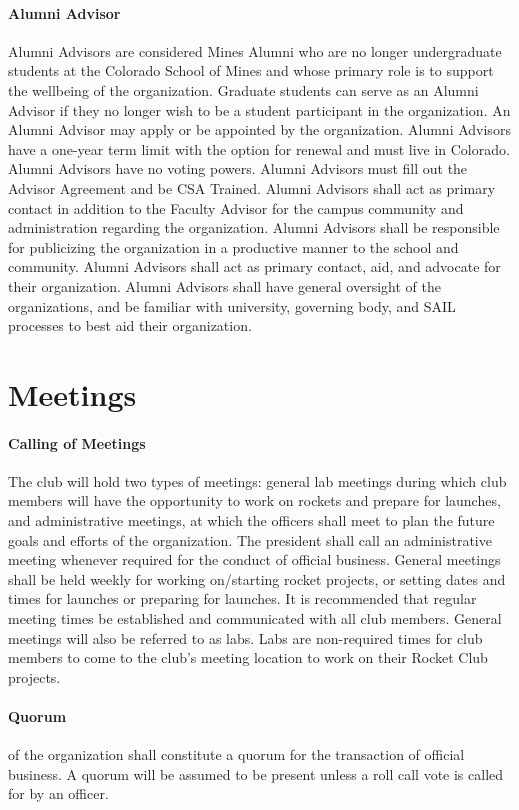 \documentclass[12pt]{article}
\begin{document}
\paragraph{Alumni Advisor}
Alumni Advisors are considered Mines Alumni who are no longer undergraduate students at the Colorado School of Mines and whose primary role is to support the wellbeing of the organization. 
Graduate students can serve as an Alumni Advisor if they no longer wish to be a student participant in the organization. 
An Alumni Advisor may apply or be appointed by the organization. Alumni Advisors have a one-year term limit with the option for renewal and must live in Colorado. 
Alumni Advisors have no voting powers. Alumni Advisors must fill out the Advisor Agreement and be CSA Trained. 
Alumni Advisors shall act as primary contact in addition to the Faculty Advisor for the campus community and administration regarding the organization. 
Alumni Advisors shall be responsible for publicizing the organization in a productive manner to the school and community. 
Alumni Advisors shall act as primary contact, aid, and advocate for their organization. 
Alumni Advisors shall have general oversight of the organizations, and be familiar with university, governing body, and SAIL processes to best aid their organization.

\section{Meetings}
\paragraph{Calling of Meetings}
The club will hold two types of meetings: general lab meetings during which club members will have the opportunity to work on rockets and prepare for launches, 
and administrative meetings, at which the officers shall meet to plan the future goals and efforts of the organization.
The president shall call an administrative meeting whenever required for the conduct of official business. 
General meetings shall be held weekly for working on/starting rocket projects, 
or setting dates and times for launches or preparing for launches. 
It is recommended that regular meeting times be established and communicated with all club members. 
General meetings will also be referred to as labs. 
Labs are non-required times for club members to come to the club's meeting location to work on their Rocket Club projects. 
\paragraph{Quorum}
 of the organization shall constitute a quorum for the transaction of official business. 
A quorum will be assumed to be present unless a roll call vote is called for by an officer.
\end{document}
